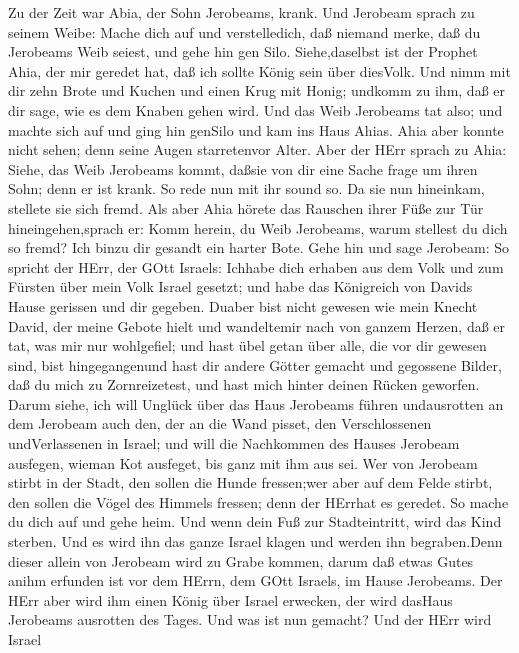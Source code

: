  Zu der Zeit war Abia, der Sohn Jerobeams, krank.
 Und Jerobeam sprach zu seinem Weibe: Mache dich auf und
verstelledich, daß niemand merke, daß du Jerobeams Weib seiest, und gehe
hin gen Silo. Siehe,daselbst ist der Prophet Ahia, der mir geredet hat,
daß ich sollte König sein über diesVolk.  Und nimm mit dir
zehn Brote und Kuchen und einen Krug mit Honig; undkomm zu ihm, daß er
dir sage, wie es dem Knaben gehen wird.  Und das Weib
Jerobeams tat also; und machte sich auf und ging hin genSilo und kam ins
Haus Ahias. Ahia aber konnte nicht sehen; denn seine Augen starretenvor
Alter.  Aber der HErr sprach zu Ahia: Siehe, das Weib
Jerobeams kommt, daßsie von dir eine Sache frage um ihren Sohn; denn er
ist krank. So rede nun mit ihr sound so. Da sie nun hineinkam, stellete
sie sich fremd.  Als aber Ahia hörete das Rauschen ihrer
Füße zur Tür hineingehen,sprach er: Komm herein, du Weib Jerobeams,
warum stellest du dich so fremd? Ich binzu dir gesandt ein harter Bote.
 Gehe hin und sage Jerobeam: So spricht der HErr, der GOtt
Israels: Ichhabe dich erhaben aus dem Volk und zum Fürsten über mein
Volk Israel gesetzt;  und habe das Königreich von Davids
Hause gerissen und dir gegeben. Duaber bist nicht gewesen wie mein
Knecht David, der meine Gebote hielt und wandeltemir nach von ganzem
Herzen, daß er tat, was mir nur wohlgefiel;  und hast übel
getan über alle, die vor dir gewesen sind, bist hingegangenund hast dir
andere Götter gemacht und gegossene Bilder, daß du mich zu
Zornreizetest, und hast mich hinter deinen Rücken geworfen.
 Darum siehe, ich will Unglück über das Haus Jerobeams
führen undausrotten an dem Jerobeam auch den, der an die Wand pisset,
den Verschlossenen undVerlassenen in Israel; und will die Nachkommen des
Hauses Jerobeam ausfegen, wieman Kot ausfeget, bis ganz mit ihm aus sei.
 Wer von Jerobeam stirbt in der Stadt, den sollen die Hunde
fressen;wer aber auf dem Felde stirbt, den sollen die Vögel des Himmels
fressen; denn der HErrhat es geredet.  So mache du dich auf
und gehe heim. Und wenn dein Fuß zur Stadteintritt, wird das Kind
sterben.  Und es wird ihn das ganze Israel klagen und
werden ihn begraben.Denn dieser allein von Jerobeam wird zu Grabe
kommen, darum daß etwas Gutes anihm erfunden ist vor dem HErrn, dem GOtt
Israels, im Hause Jerobeams.  Der HErr aber wird ihm einen
König über Israel erwecken, der wird dasHaus Jerobeams ausrotten des
Tages. Und was ist nun gemacht?  Und der HErr wird Israel
